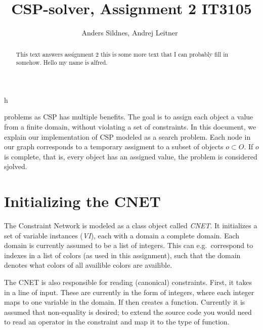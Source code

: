 \documentclass[journal]{IEEEtran}
\begin{document}
%
\title{CSP-solver, Assignment 2 IT3105}

\author{Anders Sildnes, Andrej Leitner~%
}%

%
{h}

\maketitle

\begin{abstract}
    This text answers assignment 2
    this is some more text that I can probably fill in somehow.
    Hello my name is alfred.
\end{abstract}

 problems as CSP has multiple benefits.
The goal is to assign each object a value from a finite domain,
without violating a set of constraints. In this document,
we explain our implementation of CSP modeled as a search problem.
Each node in our graph corresponds to a temporary assigment
to a subset of objects $o \subset O$. If $o$  is complete, that is, every object
has an assigned value, the problem is considered sjolved.

\section{Initializing the CNET}
The Constraint Network is modeled as a class object called \textit{CNET}.
It initializes a set of variable instances (\textit{VI}), each with
a domain a complete domain. Each domain is currently assumed
to be a list of integers. This can e.g.\ correspond to indexes in a list of 
colors (as used in this assignment), such that the domain denotes
what colors of all availible colors are availible.

The CNET is also responsible for reading (canonical) constraints.
First, it takes in a line of input. These are currently in the form
of integers, where each integer maps to one variable in the domain.
If then creates a function. Currently it is assumed that non-equality
is desired; to extend the source code you would need to read an operator
in the constraint and map it to the type of function.
\end{document}
